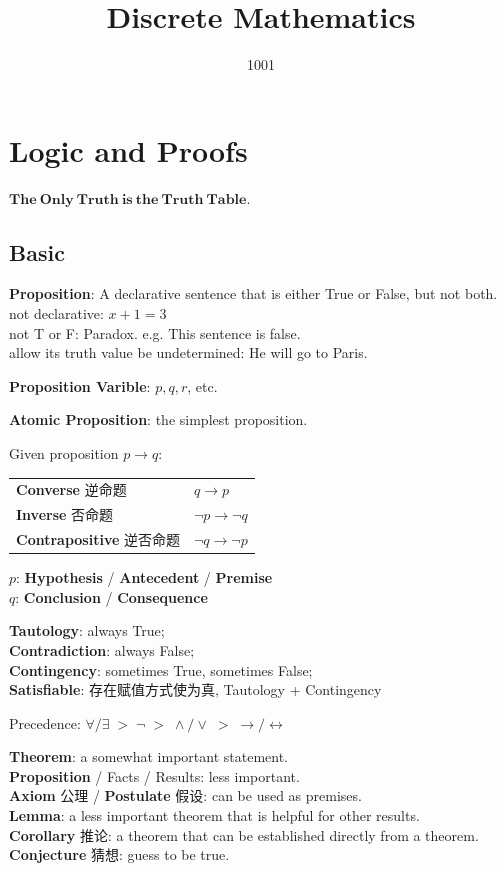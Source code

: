 \documentclass[12pt, a4paper, UTF8, openany]{ctexbook}
\title{Discrete Mathematics}
\author{1001}
\newcommand{\bi}{\leftrightarrow} %
\begin{document}
\maketitle

\tableofcontents %
\cleardoublepage

\chapter{Logic and Proofs}
{\large $\mathbf{The\ Only\ Truth\ is\ the\ Truth\ Table.}$}

    \section{Basic}
    \textbf{Proposition}: A declarative sentence that is either True or False, but not both. \\
    not declarative: $x + 1 = 3$ \\
    not T or F: Paradox. e.g. This sentence is false. \\
    allow its truth value be undetermined: He will go to Paris.

    \textbf{Proposition Varible}: $p, q, r$, etc.

    \textbf{Atomic Proposition}: the simplest proposition.

    Given proposition $p \to q$:
    \begin{longtable}[h]{*{2}{l}}
        \textbf{Converse} 逆命题 & $q \to p$ \\
        \textbf{Inverse} 否命题 & $\lnot p \to \lnot q$ \\
        \textbf{Contrapositive} 逆否命题 & $\lnot q \to \lnot p$
    \end{longtable}

    $p$: \textbf{Hypothesis} / \textbf{Antecedent} / \textbf{Premise} \\
    $q$: \textbf{Conclusion} / \textbf{Consequence}

    \textbf{Tautology}: always True; \\
    \textbf{Contradiction}: always False; \\
    \textbf{Contingency}: sometimes True, sometimes False; \\
    \textbf{Satisfiable}: 存在赋值方式使为真, Tautology + Contingency

    Precedence: $\forall/\exists \;>\; \lnot \;>\; \land/\lor \;>\; \to/\bi$

    \textbf{Theorem}: a somewhat important statement. \\
    \textbf{Proposition} / Facts / Results: less important. \\
    \textbf{Axiom} 公理 / \textbf{Postulate} 假设: can be used as premises. \\
    \textbf{Lemma}: a less important theorem that is helpful for other results. \\
    \textbf{Corollary} 推论: a theorem that can be established directly from a theorem. \\
    \textbf{Conjecture} 猜想: guess to be true.
\end{document}
